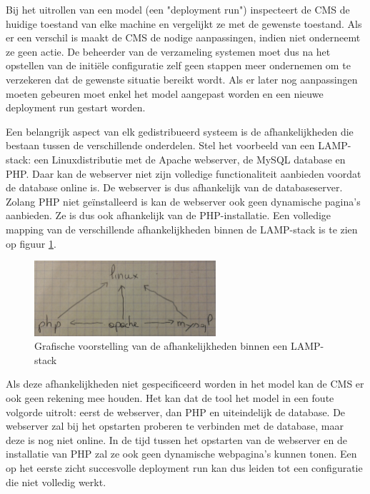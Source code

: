 Bij het uitrollen van een model (een "deployment run") inspecteert de CMS de huidige toestand van elke machine en vergelijkt ze met de gewenste toestand.
Als er een verschil is maakt de CMS de nodige aanpassingen, indien niet onderneemt ze geen actie.
De beheerder van de verzameling systemen moet dus na het opstellen van de initi\"ele configuratie zelf geen stappen meer ondernemen om te verzekeren dat de gewenste situatie bereikt wordt.
Als er later nog aanpassingen moeten gebeuren moet enkel het model aangepast worden en een nieuwe deployment run gestart worden.

Een belangrijk aspect van elk gedistribueerd systeem is de afhankelijkheden die bestaan tussen de verschillende onderdelen.
Stel het voorbeeld van een LAMP-stack: een Linuxdistributie met de Apache webserver, de MySQL database en PHP.
Daar kan de webserver niet zijn volledige functionaliteit aanbieden voordat de database online is.
De webserver is dus afhankelijk van de databaseserver.
Zolang PHP niet ge\"installeerd is kan de webserver ook geen dynamische pagina's aanbieden.
Ze is dus ook afhankelijk van de PHP-installatie.
Een volledige mapping van de verschillende afhankelijkheden binnen de LAMP-stack is te zien op figuur \ref{fig:lamp_dep}.
\begin{figure}[h]
    \begin{center}
    \includegraphics[width=0.6\textwidth]{images/lamp_dep.png}
    \caption{Grafische voorstelling van de afhankelijkheden binnen een LAMP-stack}
    \label{fig:lamp_dep}
    \end{center}
\end{figure}

Als deze afhankelijkheden niet gespecificeerd worden in het model kan de CMS er ook geen rekening mee houden.
Het kan dat de tool het model in een foute volgorde uitrolt: eerst de webserver, dan PHP en uiteindelijk de database.
De webserver zal bij het opstarten proberen te verbinden met de database, maar deze is nog niet online.
In de tijd tussen het opstarten van de webserver en de installatie van PHP zal ze ook geen dynamische webpagina's kunnen tonen.
Een op het eerste zicht succesvolle deployment run kan dus leiden tot een configuratie die niet volledig werkt.

